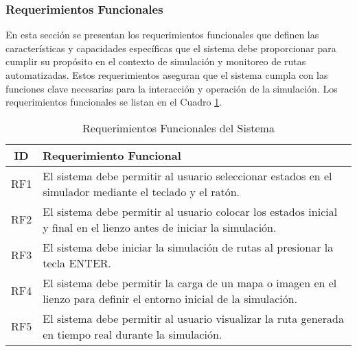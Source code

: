 \subsubsection{Requerimientos Funcionales} %

    En esta secci\'on se presentan los requerimientos funcionales que definen las 
        caracter\'isticas y capacidades espec\'ificas que el sistema debe proporcionar 
        para cumplir su prop\'osito en el contexto de simulaci\'on y monitoreo de rutas 
        automatizadas. Estos requerimientos aseguran que el sistema cumpla con las 
        funciones clave necesarias para la interacci\'on y operaci\'on de la simulaci\'on.
        Los requerimientos funcionales se listan en el Cuadro \ref{tab:requerimientos_funcionales}.
    \vskip 0.5cm
    \begin{table}[h!]
        \centering
        \begin{tabular}{|c|p{12cm}|}
        \hline
        \textbf{ID} & \textbf{Requerimiento Funcional} \\
        \hline
        RF1 & El sistema debe permitir al usuario seleccionar estados en el simulador mediante el teclado y el rat\'on. \\
        \hline
        RF2 & El sistema debe permitir al usuario colocar los estados inicial y final en el lienzo antes de iniciar la simulaci\'on. \\
        \hline
        RF3 & El sistema debe iniciar la simulaci\'on de rutas al presionar la tecla ENTER. \\
        \hline
        RF4 & El sistema debe permitir la carga de un mapa o imagen en el lienzo para definir el entorno inicial de la simulaci\'on. \\
        \hline
        RF5 & El sistema debe permitir al usuario visualizar la ruta generada en tiempo real durante la simulaci\'on. \\
        \hline
        \end{tabular}
        \caption{Requerimientos Funcionales del Sistema}
        \label{tab:requerimientos_funcionales}
    \end{table}